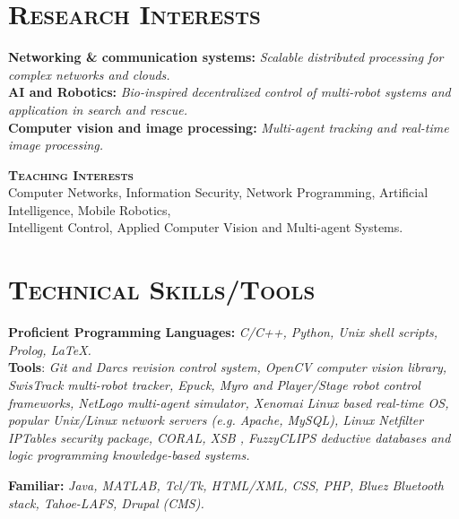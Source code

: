 \documentclass[notopicbreak,contbibnum,plain]{simplecv}
\begin{document}
\section{\textsc{Research Interests}}
\begin{topic}
\vspace*{-0.3cm}
\item \textbf{Networking \& communication systems:} \textit{Scalable distributed processing for complex networks and clouds.}\\
\textbf{AI and Robotics:} \textit{Bio-inspired decentralized control of multi-robot systems and application in search and rescue.}\\
\textbf{Computer vision and image processing:}\textit{ Multi-agent tracking and real-time image processing.}
\item \textbf{\textsc{Teaching Interests}}\\ Computer Networks, Information Security, Network Programming, Artificial Intelligence, Mobile Robotics,\\ Intelligent Control, Applied Computer Vision and Multi-agent Systems.
\vspace*{-0.25cm}
\end{topic}
\section{\textsc{Technical Skills/Tools}}
\vspace*{-0.3cm}
\begin{topic}
\item \textbf{Proficient Programming Languages:} \textit{C/C++, Python, Unix shell scripts, Prolog, LaTeX.}\\
	\textbf{Tools}: \textit{Git and Darcs revision control system, OpenCV computer vision library, SwisTrack multi-robot tracker, Epuck, Myro and Player/Stage robot control frameworks, NetLogo multi-agent simulator, Xenomai Linux based real-time OS, popular Unix/Linux network servers (e.g. Apache, MySQL), Linux Netfilter IPTables security package, CORAL, XSB , FuzzyCLIPS deductive databases and  logic programming knowledge-based systems.}
\vspace*{-0.1cm}
\item \textbf{Familiar:}
\textit{Java, MATLAB, Tcl/Tk, HTML/XML, CSS, PHP, Bluez Bluetooth stack, Tahoe-LAFS, Drupal (CMS).}
\vspace*{-0.3cm}
\end{topic}
\vspace*{-0.3cm}
\end{document}
